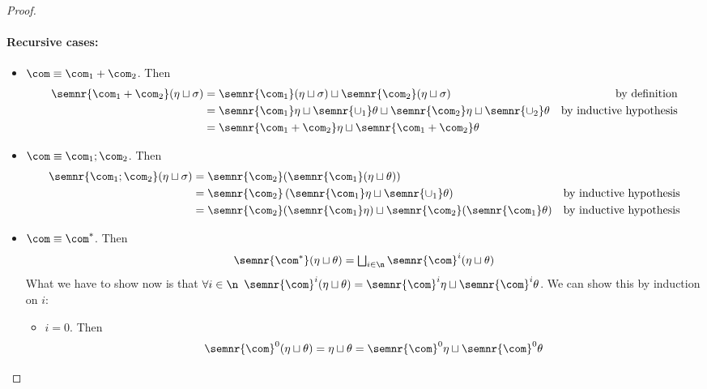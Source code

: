 \begin{proof}
  \paragraph*{Recursive cases: \\}
  \begin{itemize}
  \item \(\com \equiv \com_1 + \com_2\). Then
    \begin{align*}
      \semnr{\com_1 + \com_2}(\eta \sqcup \sigma) & = \semnr{\com_1}(\eta \sqcup \sigma) \sqcup \semnr{\com_2}(\eta \sqcup \sigma) & \text{by definition}\\
                                                  & = \semnr{\com_1}\eta \sqcup \semnr{\cup_1}\theta \sqcup \semnr{\com_2}\eta \sqcup \semnr{\cup_2}\theta & \text{by inductive hypothesis} \\
                                                  & = \semnr{\com_1 + \com_2}\eta \sqcup \semnr{\com_1 + \com_2}\theta
    \end{align*}
  \item \(\com \equiv \com_1 ; \com_2\). Then
    \begin{align*}
      \semnr{\com_1 ; \com_2}(\eta \sqcup \sigma) & = \semnr{\com_2}(\semnr{\com_1}(\eta \sqcup \theta)) \\
                                                  & = \semnr{\com_2}\left(\semnr{\com_1}\eta \sqcup \semnr{\cup_1}\theta\right) & \text{by inductive hypothesis} \\
                                                  & = \semnr{\com_2}(\semnr{\com_1}\eta) \sqcup \semnr{\com_2}(\semnr{\com_1}\theta) & \text{by inductive hypothesis}
    \end{align*}
  \item \(\com \equiv \com^*\). Then
    \begin{equation*}
      \semnr{\com^*}(\eta\sqcup\theta) = \textstyle \bigsqcup_{i\in\n} \semnr{\com}^i(\eta \sqcup \theta) \\
    \end{equation*}
    What we have to show now is that \(\forall i \in \n\)
    \(\semnr{\com}^i(\eta \sqcup \theta) = \semnr{\com}^i \eta \sqcup
    \semnr{\com}^i\theta\). We can show this by induction on \(i\):
    \begin{itemize}
    \item \(i=0\). Then
      \begin{equation*}
        \semnr{\com}^0(\eta\sqcup\theta) = \eta\sqcup\theta = \semnr{\com}^0\eta \sqcup \semnr{\com}^0\theta

\end{equation*}
\end{itemize}
\end{itemize}
\end{proof}
